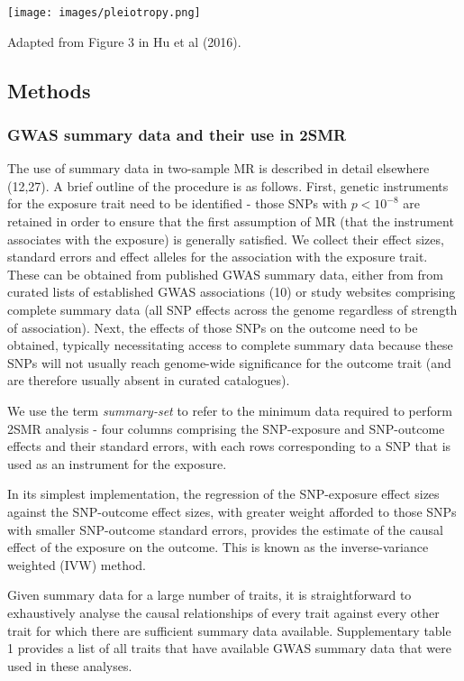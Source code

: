 \documentclass[]{article}
\begin{document}
\texttt{[image: images/pleiotropy.png]}

Adapted from Figure 3 in Hu et al (2016).

\subsection{Methods}\label{methods}

\subsubsection{GWAS summary data and their use in
2SMR}\label{gwas-summary-data-and-their-use-in-2smr}

The use of summary data in two-sample MR is described in detail
elsewhere (12,27). A brief outline of the procedure is as follows.
First, genetic instruments for the exposure trait need to be identified
- those SNPs with \(p < 10^{-8}\) are retained in order to ensure that
the first assumption of MR (that the instrument associates with the
exposure) is generally satisfied. We collect their effect sizes,
standard errors and effect alleles for the association with the exposure
trait. These can be obtained from published GWAS summary data, either
from from curated lists of established GWAS associations (10) or study
websites comprising complete summary data (all SNP effects across the
genome regardless of strength of association). Next, the effects of
those SNPs on the outcome need to be obtained, typically necessitating
access to complete summary data because these SNPs will not usually
reach genome-wide significance for the outcome trait (and are therefore
usually absent in curated catalogues).

We use the term \emph{summary-set} to refer to the minimum data required
to perform 2SMR analysis - four columns comprising the SNP-exposure and
SNP-outcome effects and their standard errors, with each rows
corresponding to a SNP that is used as an instrument for the exposure.

In its simplest implementation, the regression of the SNP-exposure
effect sizes against the SNP-outcome effect sizes, with greater weight
afforded to those SNPs with smaller SNP-outcome standard errors,
provides the estimate of the causal effect of the exposure on the
outcome. This is known as the inverse-variance weighted (IVW) method.

Given summary data for a large number of traits, it is straightforward
to exhaustively analyse the causal relationships of every trait against
every other trait for which there are sufficient summary data available.
Supplementary table 1 provides a list of all traits that have available
GWAS summary data that were used in these analyses.
\end{document}
